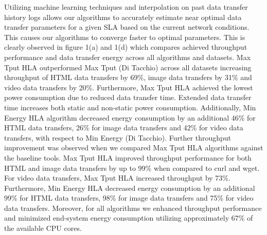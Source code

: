 \documentclass[conference]{IEEEtran}
\begin{document}
Utilizing machine learning techniques and interpolation on past data transfer history logs allows our algorithms to accurately estimate near optimal data transfer parameters for a given SLA based on the current network conditions. This causes our algorithms to converge faster to optimal parameters. This is clearly observed in figure 1(a) and 1(d) which compares achieved throughput performance and data transfer energy across all algorithms and datasets. %
Max Tput HLA outperformed Max Tput (Di Tacchio)  across all datasets increasing throughput of HTML data transfers by 69\%, image data transfers by 31\% and video data transfers by 20\%. Furthermore, Max Tput HLA achieved the lowest power consumption due to reduced data transfer time. Extended data transfer time increases both static and non-static power consumption. Additionally, Min Energy HLA algorithm decreased energy consumption by an additional 46\% for HTML data transfers, 26\% for image data transfers and 42\% for video data transfers, with respect to Min Energy (Di Tacchio). Further throughput improvement was observed when we compared Max Tput HLA algorithms against the baseline tools. Max Tput HLA improved throughput performance for both HTML and image data transfers by up to 99\% when compared to curl and wget. For video data transfers, Max Tput HLA increased throughput by 73\%. Furthermore, Min Energy HLA decreased energy consumption by an additional 99\% for HTML data transfers, 98\% for image data transfers and 75\% for video data transfers. 
Moreover, for all algorithms we enhanced throughput performance and minimized end-system energy consumption utilizing approximately 67\% of the available CPU cores.\par 
\end{document}
